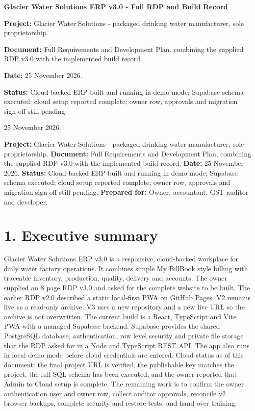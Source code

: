\documentclass[11pt]{article}
\begin{document}
\begin{titlepage}
\centering
\vspace*{4cm}
{\Huge\bfseries\color{headnavy} Glacier Water Solutions ERP v3.0 - Full RDP and Build Record\par}
\vspace{16pt}
{\large \textbf{Project:} Glacier Water Solutions - packaged drinking water manufacturer, sole proprietorship.\par}
{\large \textbf{Document:} Full Requirements and Development Plan, combining the supplied RDP v3.0 with the implemented build record.\par}
{\large \textbf{Date:} 25 November 2026.\par}
{\large \textbf{Status:} Cloud-backed ERP built and running in demo mode; Supabase schema executed; cloud setup reported complete; owner row, approvals and migration sign-off still pending.\par}
\vspace{18pt}
{\large 25 November 2026.\par}
\vfill
\end{titlepage}
\tableofcontents

\textbf{Project:} Glacier Water Solutions - packaged drinking water manufacturer, sole proprietorship. \textbf{Document:} Full Requirements and Development Plan, combining the supplied RDP v3.0 with the implemented build record. \textbf{Date:} 25 November 2026. \textbf{Status:} Cloud-backed ERP built and running in demo mode; Supabase schema executed; cloud setup reported complete; owner row, approvals and migration sign-off still pending. \textbf{Prepared for:} Owner, accountant, GST auditor and developer.
\clearpage
\section{1. Executive summary}
Glacier Water Solutions ERP v3.0 is a responsive, cloud-backed workplace for daily water factory operations. It combines simple My BillBook style billing with traceable inventory, production, quality, delivery and accounts.
The owner supplied an 8 page RDP v3.0 and asked for the complete website to be built. The earlier RDP v2.0 described a static local-first PWA on GitHub Pages. V2 remains live as a read-only archive. V3 uses a new repository and a new live URL so the archive is not overwritten.
The current build is a React, TypeScript and Vite PWA with a managed Supabase backend. Supabase provides the shared PostgreSQL database, authentication, row level security and private file storage that the RDP asked for in a Node and TypeScript REST API. The app also runs in local demo mode before cloud credentials are entered.
Cloud status as of this document: the final project URL is verified, the publishable key matches the project, the full SQL schema has been executed, and the owner reported that Admin to Cloud setup is complete. The remaining work is to confirm the owner authentication user and owner row, collect auditor approvals, reconcile v2 browser backups, complete security and restore tests, and hand over training.
\clearpage
\end{document}
